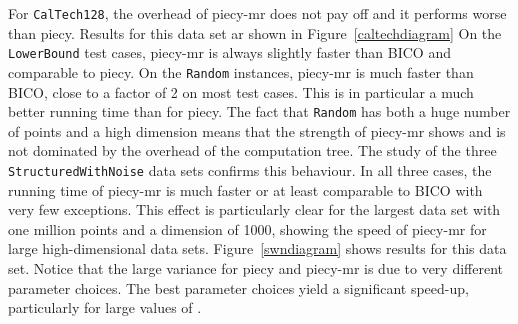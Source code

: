 \documentclass[a4paper]{scrartcl}
\begin{document}
For \texttt{CalTech128}, the overhead of piecy-mr does not pay off and it performs worse than piecy. Results for this data set ar shown in Figure~\ref{caltechdiagram}
On the \texttt{LowerBound} test cases, piecy-mr is always slightly faster than BICO and comparable to piecy.
On the \texttt{Random} instances, piecy-mr is much faster than BICO, close to a factor of 2 on most test cases. This is in particular a much better running time than for piecy. The fact that \texttt{Random} has both a huge number of points and a high dimension means that the strength of piecy-mr shows and is not dominated by the overhead of the computation tree. The study of the three \texttt{StructuredWithNoise} data sets confirms this behaviour. In all three cases, the running time of piecy-mr is much faster or at least comparable to BICO with very few exceptions. This effect is particularly clear for the largest data set with one million points and a dimension of 1000, showing the speed of piecy-mr for large high-dimensional data sets. Figure~\ref{swndiagram} shows results for this data set. Notice that the large variance for piecy and piecy-mr is due to very different parameter choices. The best parameter choices yield a significant speed-up, particularly for large values of .
\end{document}
